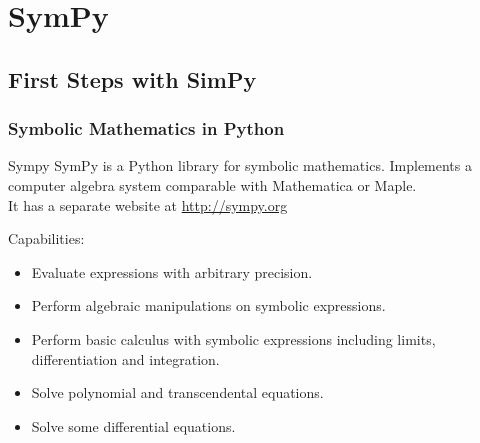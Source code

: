 \documentclass[10pt,colorlinks]{beamer}
\begin{document}


\section{SymPy}
\subsection{First Steps with SimPy} %
\label{sub:First Steps with SimPy}
\begin{frame}[fragile]\frametitle{Symbolic Mathematics in Python}

\begin{block}{Sympy}
SymPy is a Python library for symbolic mathematics. Implements a computer algebra system comparable with Mathematica or Maple.\\
It has a separate website at \href{http://sympy.org}{http://sympy.org}
\end{block}
Capabilities:
\begin{itemize}
    \item Evaluate expressions with arbitrary precision.
    \item Perform algebraic manipulations on symbolic expressions.
    \item Perform basic calculus with symbolic expressions including limits, differentiation and integration.
    \item Solve polynomial and transcendental equations.
    \item Solve some differential equations.
\end{itemize}
\end{frame}
\end{document}
